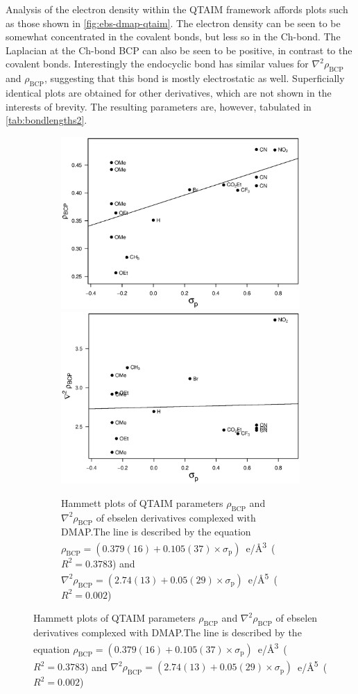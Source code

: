 \begin{refsection}
Analysis of the electron density within the QTAIM framework affords plots such as those shown in \cref{fig:ebs-dmap-qtaim}.
The electron density can be seen to be somewhat concentrated in the covalent  bonds, but less so in the Ch-bond.
The Laplacian at the Ch-bond BCP can also be seen to be positive, in contrast to the covalent bonds.
Interestingly the endocyclic  bond has similar values for $\nabla^2\rho_{\text{BCP}}$ and $\rho_\text{BCP}$, suggesting that this bond is mostly electrostatic as well.
Superficially identical plots are obtained for other derivatives, which are not shown in the interests of brevity.
The resulting parameters are, however, tabulated in \cref{tab:bondlengths2}.

\begin{figure}
  \centering
  \begin{subfigure}{\linewidth}
    \centering
    \includegraphics[width=0.45\linewidth]{Figures/hammett-rho-dmap-p.eps}
    \includegraphics[width=0.45\linewidth]{Figures/hammett-lapl-dmap-p.eps}
    \caption[Hammett plots of QTAIM parameters $\rho_\text{BCP}$ and $\nabla^2\rho_{\text{BCP}}$ of ebselen derivatives complexed with DMAP.]{Hammett plots of QTAIM parameters $\rho_\text{BCP}$ and $\nabla^2\rho_{\text{BCP}}$ of ebselen derivatives complexed with DMAP.\@ The line is described by the equation $\rho_{\text{BCP}} = (0.379(16) + 0.105(37) \times \sigma_\text{p})$~e/\AA\textsuperscript{3}~($R^2=0.3783$) and $\nabla^2\rho_{\text{BCP}} = (2.74(13) + 0.05(29) \times \sigma_\text{p})$~e/\AA\textsuperscript{5}~($R^2=0.002$)}\label{fig:hammett-qtaim-dmap}
  \end{subfigure}
  

\end{figure}
\end{refsection}
